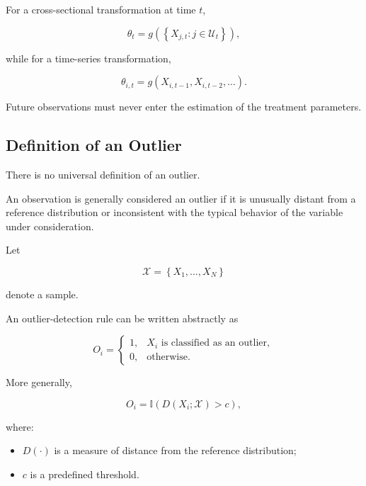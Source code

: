 \documentclass[11pt,a4paper]{article}
\begin{document}
For a cross-sectional transformation at time $t$,

\begin{equation}
\theta_t
=
g
\left(
\left\{
X_{j,t}
:
j\in\mathcal{U}_t
\right\}
\right),
\end{equation}

while for a time-series transformation,

\begin{equation}
\theta_{i,t}
=
g
\left(
X_{i,t-1},
X_{i,t-2},
\ldots
\right).
\end{equation}

Future observations must never enter the estimation of the treatment
parameters.


\subsection{Definition of an Outlier}
\label{subsec:definition_outlier}

There is no universal definition of an outlier.

An observation is generally considered an outlier if it is unusually distant
from a reference distribution or inconsistent with the typical behavior of the
variable under consideration.

Let

\begin{equation}
\mathcal{X}
=
\left\{
X_1,\ldots,X_N
\right\}
\end{equation}

denote a sample.

An outlier-detection rule can be written abstractly as

\begin{equation}
O_i
=
\begin{cases}
1,
&
X_i
\text{ is classified as an outlier},
\\
0,
&
\text{otherwise}.
\end{cases}
\end{equation}

More generally,

\begin{equation}
\boxed{
O_i
=
\mathbb{I}
\left(
D(X_i;\mathcal{X})
>
c
\right),
}
\end{equation}

where:

\begin{itemize}
    \item $D(\cdot)$ is a measure of distance from the reference distribution;
    \item $c$ is a predefined threshold.
\end{itemize}
\end{document}

